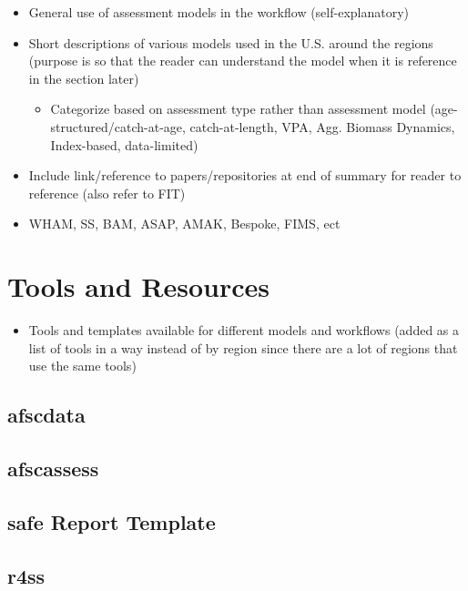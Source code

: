 \documentclass[
  letterpaper,
  DIV=11,
  numbers=noendperiod]{scrreprt}
\providecommand{\tightlist}{%
  \setlength{\itemsep}{0pt}\setlength{\parskip}{0pt}}\usepackage{longtable,booktabs,array}
\begin{document}
\begin{itemize}
\item
  General use of assessment models in the workflow (self-explanatory)
\item
  Short descriptions of various models used in the U.S. around the
  regions (purpose is so that the reader can understand the model when
  it is reference in the section later)

  \begin{itemize}
  \tightlist
  \item
    Categorize based on assessment type rather than assessment model
    (age-structured/catch-at-age, catch-at-length, VPA, Agg. Biomass
    Dynamics, Index-based, data-limited)
  \end{itemize}
\item
  Include link/reference to papers/repositories at end of summary for
  reader to reference (also refer to FIT)
\item
  WHAM, SS, BAM, ASAP, AMAK, Bespoke, FIMS, ect
\end{itemize}


\chapter{Tools and Resources}\label{sec-tools}

\begin{itemize}
\tightlist
\item
  Tools and templates available for different models and workflows
  (added as a list of tools in a way instead of by region since there
  are a lot of regions that use the same tools)
\end{itemize}

\section{afscdata}\label{sec-afscdata}

\section{afscassess}\label{sec-afscassess}

\section{safe Report Template}\label{sec-safe}

\section{r4ss}\label{sec-r4ss}
\end{document}
